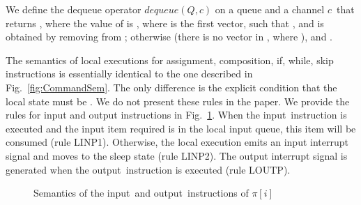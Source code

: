 \documentclass[10pt,a4paper,oneside]{article}
\def\dequeue#1#2{\ensuremath{dequeue(#1, #2)}}
\def\constructV#1#2{\ensuremath{\ouvd[#2\mapsto#1]}}
\def\substitute#1#2#3{\ensuremath{#1[#2\mapsto#3]}}
\def\intsig#1{\ensuremath{#1}}
\def\st{\ensuremath{st}}
\def\sE{\textbf{E}}
\def\sS{\textbf{S}}
\def\ST{{\ensuremath{EX}}}
\def\ouvd{\ensuremath{\vec{\bot}}}
\def\chnl{\ensuremath{c}}
\def\NIL{\ensuremath{\bot}}
\def\ACCORCIA{\vspace*{-\baselineskip}}
\def\lcomma{\ensuremath{\!\!:\!\!}}
\def\valueM{\ensuremath{val}}
\def\Prog{\ensuremath{\pi}}
\def\Progl#1{\ensuremath{\Prog[#1]}}
\def\comm{\ensuremath{\pi}}
\def\Iid{\ensuremath{I}}
\def\Oid{\ensuremath{O}}
\def\LabelRule#1#2#3{\ensuremath{{\inferrule*[Left={#1}]{#2}{#3}}}}
\def\RINPUTYL{LINP1}
\def\RINPUTNL{LINP2}
\def\ROUTPUTL{LOUTP}
\def\NINPUT{input}
\def\NOUTPUT{output}
\def\lprog{{\sf prg}}
\def\lmem{{\sf mem}}
\def\lmemi{{\sf \ensuremath{mem}}}
\def\linputi{{\sf in}}
\def\loutputi{{\sf out}}
\def\litr{{\sf int}}
\def\lstate{{\sf stt}}
\begin{document}
We define the dequeue operator \dequeue{Q}{\chnl} on a queue  and a channel \chnl\ that returns , where the value of  is ,  where  is the first vector, such that , and  is obtained by removing  from ; otherwise (there is no vector  in , where ),   and .


The semantics of local executions for assignment, composition, if, while, skip instructions is essentially identical to the one described in Fig.~\ref{fig:CommandSem}. The only difference is the explicit condition that the local state must be . We do not present these rules in the paper. We provide the rules for input and output instructions in Fig.~\ref{fig:LocCommandSem2}. When the \NINPUT\ instruction is executed and the input item required is in the local input queue, this item will be consumed (rule \RINPUTYL). Otherwise, the local execution emits an input interrupt signal  and moves to the sleep state (rule \RINPUTNL).  The output interrupt signal  is generated when the \NOUTPUT\ instruction is executed (rule \ROUTPUTL).

\begin{figure}[!t]
\begin{center}
\ACCORCIA
{}
\ACCORCIA
\caption{Semantics of the \NINPUT\ and \NOUTPUT\ instructions of \Progl{i}}
    \label{fig:LocCommandSem2}
\end{center}
\end{figure}
\end{document}
